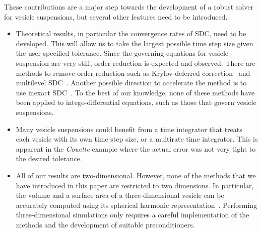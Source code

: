 These contributions are a major step towards the development of a robust
solver for vesicle suspensions, but several other features need to be
introduced.
\begin{itemize}
  \item Theoretical results, in particular the convergence rates of
  SDC, need to be developed.  This will allow us to take the largest
  possible time step size given the user specified tolerance.  Since
  the governing equations for vesicle suspension are very stiff, order
  reduction is expected and observed.  There are methods to remove
  order reduction such as Krylov deferred
  correction~\cite{hua:jia:min2006, hua:jia:min2007, bu:hua:min2012,
  bu:hua:min2009, jia:hua2008} and multilevel SDC~\cite{emm:min2012,
  min:spe:bol:emm:rup2015, spe:rup:emm:min:bol:kra2014}.  Another
  possible direction to accelerate the method is to use inexact
  SDC~\cite{spe:rup:min:emm:kra2014, spe:rup:emm:min:bol:kra2014,
  min:spe:bol:emm:rup2015}.  To the best of our knowledge, none of
  these methods have been applied to intego-differential equations,
  such as those that govern vesicle suspensions.

  \item Many vesicle suspensions could benefit from a time integrator
  that treats each vesicle with its own time step size, or a multirate
  time integrator.  This is apparent in the {\em Couette} example where
  the actual error was not very tight to the desired tolerance.

  \item All of our results are two-dimensional.  However, none of the
  methods that we have introduced in this paper are restricted to two
  dimensions.  In particular, the volume and a surface area of a
  three-dimensional vesicle can be accurately computed using its
  spherical harmonic representation~\cite{vee:rah:bir:zor2011}.
  Performing three-dimensional simulations only requires a careful
  implementation of the methods and the development of suitable
  preconditioners.

\end{itemize}
